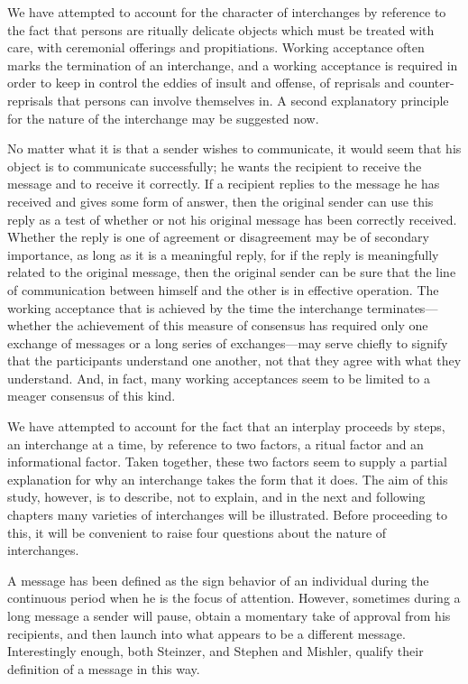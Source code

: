 \documentclass[openany,nobib]{tufte-book}
\begin{document}
We have attempted to account for the character of interchanges by
reference to the fact that persons are ritually delicate objects which
must be treated with care, with ceremonial offerings and propitiations.
Working acceptance often marks the termination of an interchange, and a
working acceptance is required in order to keep in control the eddies of
insult and offense, of reprisals and counter-reprisals that persons can
involve themselves in. A second explanatory principle for the nature of
the interchange may be suggested now.

No matter what it is that a sender wishes to communicate, it would seem
that his object is to communicate successfully; he wants the recipient
to receive the message and to receive it correctly. If a recipient
replies to the message he has received and gives some form of answer,
then the original sender can use this reply as a test of whether or not
his original message has been correctly received. Whether the reply is
one of agreement or disagreement may be of secondary importance, as long
as it is a meaningful reply, for if the reply is meaningfully related to
the original message, then the original sender can be sure that the line
of communication between himself and the other is in effective
operation. The working acceptance that is achieved by the time the
interchange terminates---whether the achievement of this measure of
consensus has required only one exchange of messages or a long series of
exchanges---may serve chiefly to signify that the participants
understand one another, not that they agree with what they understand.
And, in fact, many working acceptances seem to be limited to a meager
consensus of this kind.

We have attempted to account for the fact that an interplay proceeds by
steps, an interchange at a time, by reference to two factors, a ritual
factor and an informational factor. Taken together, these two factors
seem to supply a partial explanation for why an interchange takes the
form that it does. The aim of this study, however, is to describe, not
to explain, and in the next and following chapters many varieties of
interchanges will be illustrated. Before proceeding to this, it will be
convenient to raise four questions about the nature of interchanges.

A message has been defined as the sign behavior of an individual during
the continuous period when he is the focus of attention. However,
sometimes during a long message a sender will pause, obtain a momentary
take of approval from his recipients, and then launch into what appears
to be a different message. Interestingly enough, both Steinzer, and
Stephen and Mishler, qualify their definition of a message in this way.
\end{document}
